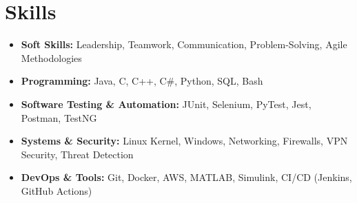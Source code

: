 \section{Skills}
\begin{itemize}
    \item \textbf{Soft Skills:} Leadership, Teamwork, Communication, Problem-Solving, Agile Methodologies
    \item \textbf{Programming:} Java, C, C++, C#, Python, SQL, Bash
    \item \textbf{Software Testing \& Automation:} JUnit, Selenium, PyTest, Jest, Postman, TestNG
    \item \textbf{Systems \& Security:} Linux Kernel, Windows, Networking, Firewalls, VPN Security, Threat Detection
    \item \textbf{DevOps \& Tools:} Git, Docker, AWS, MATLAB, Simulink, CI/CD (Jenkins, GitHub Actions)
\end{itemize}
